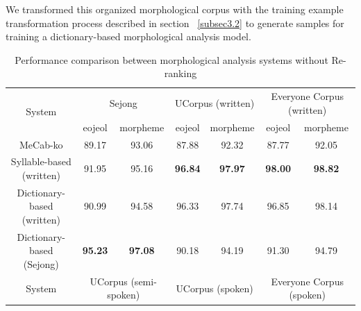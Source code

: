 \documentclass[AMS,STIX2COL]{WileyNJD-v2}
\begin{document}
    We transformed this organized morphological corpus with the training example transformation process described in section ~\ref{subsec3.2} to generate samples for training a dictionary-based morphological analysis model.

    \begin{table}[]
        \caption{Performance comparison between morphological analysis systems without Re-ranking}\label{tab:performance-without-reranking}
        \begin{tabular*}{500pt}{@{\extracolsep\fill}c|cccccc@{\extracolsep\fill}}
            \toprule
            \multirow{2}{*}{System} & \multicolumn{2}{c}{Sejong} & \multicolumn{2}{c}{UCorpus (written)} & \multicolumn{2}{c}{Everyone Corpus (written)} \\
            \cmidrule{2-3} \cmidrule{4-5} \cmidrule{6-7}
            & \multicolumn{1}{c}{eojeol} & \multicolumn{1}{c}{morpheme} & \multicolumn{1}{c}{eojeol} & \multicolumn{1}{c}{morpheme} & \multicolumn{1}{c}{eojeol} & \multicolumn{1}{c}{morpheme} \\
            \midrule
            \hspace{2mm}MeCab-ko                   & 89.17                      & 93.06                        & 87.88                      & 92.32                        & 87.77                      & 92.05                        \\
            \hspace{2mm}Syllable-based (written)   & 91.95                      & 95.16                        & \textbf{96.84}             & \textbf{97.97}               & \textbf{98.00}             & \textbf{98.82}               \\
            \hspace{2mm}Dictionary-based (written) & 90.99                      & 94.58                        & 96.33                      & 97.74                        & 96.85                      & 98.14                        \\
            \hspace{2mm}Dictionary-based (Sejong)  & \textbf{95.23}             & \textbf{97.08}               & 90.18                      & 94.19                        & 91.30                      & 94.79                        \\
            \toprule
            \multirow{2}{*}{System} & \multicolumn{2}{c}{UCorpus (semi-spoken)} & \multicolumn{2}{c}{UCorpus (spoken)} & \multicolumn{2}{c}{Everyone Corpus (spoken)} \\

\end{tabular*}
\end{table}
\end{document}
